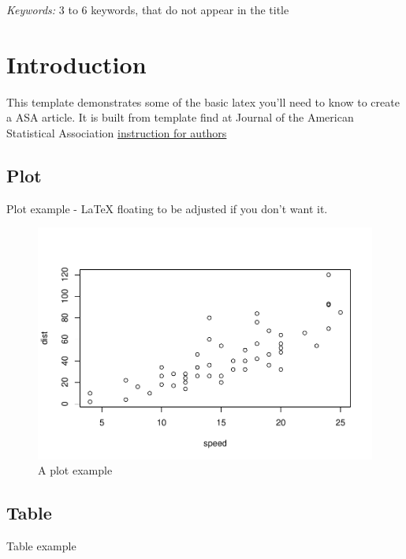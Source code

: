 \documentclass[12pt]{article}
\begin{document}
\noindent%
{\it Keywords:} 3 to 6 keywords, that do not appear in the title

\vfill

\newpage
{} %

\section{Introduction}\label{introduction}

This template demonstrates some of the basic latex you'll need to know
to create a ASA article. It is built from template find at Journal of
the American Statistical Association
\href{https://www.tandfonline.com/action/authorSubmission?show=instructions&journalCode=uasa20\#formatting}{instruction
for authors}

\subsection{Plot}\label{plot}

Plot example - LaTeX floating to be adjusted if you don't want it.

\begin{figure}
\centering
\includegraphics{ResearchPaper_files/figure-latex/unnamed-chunk-1-1.pdf}
\caption{A plot example}
\end{figure}

\subsection{Table}\label{table}

Table example
\end{document}
